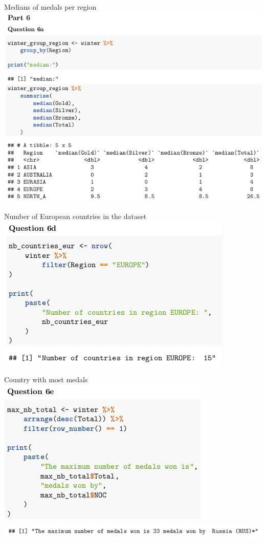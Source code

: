 \documentclass{beamer}
\begin{document}
\begin{frame}{Medians of medals per region}
    \includegraphics[width=.9\textwidth]{img/ex2_part3_screenshot11.png}
\end{frame}

\begin{frame}{Number of European countries in the dataset}
    \includegraphics[width=.8\textwidth]{img/ex2_part3_screenshot17.png}
\end{frame}

\begin{frame}{Country with most medals}
    \includegraphics[width=.8\textwidth]{img/ex2_part3_screenshot18.png}
    \includegraphics[width=\textwidth]{img/ex2_part3_screenshot19.png}
\end{frame}
\end{document}
